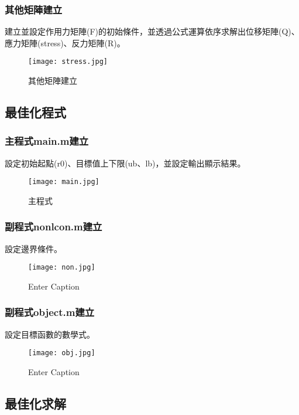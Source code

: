 \documentclass{article}
\begin{document}
\begin{CJK}{UTF8}{bsmi}
        \subsubsection{其他矩陣建立}
        建立並設定作用力矩陣(F)的初始條件，並透過公式運算依序求解出位移矩陣(Q)、應力矩陣(stress)、反力矩陣(R)。
        \begin{figure}[H]
            \centering
            \texttt{[image: stress.jpg]}
            \caption{其他矩陣建立}
            \label{fig:enter-label}
        \end{figure}
        
        
    \subsection{最佳化程式}
    
        \subsubsection{主程式main.m建立}
        設定初始起點(r0)、目標值上下限(ub、lb)，並設定輸出顯示結果。
        \begin{figure}[H]
            \centering
            \texttt{[image: main.jpg]}
            \caption{主程式}
            \label{fig:enter-label}
        \end{figure}
        
        \subsubsection{副程式nonlcon.m建立}
        設定邊界條件。
        \begin{figure}[H]
            \centering
            \texttt{[image: non.jpg]}
            \caption{Enter Caption}
            \label{fig:enter-label}
        \end{figure}
        \subsubsection{副程式object.m建立}
        設定目標函數的數學式。
        \begin{figure}[H]
            \centering
            \texttt{[image: obj.jpg]}
            \caption{Enter Caption}
            \label{fig:enter-label}
        \end{figure}

        
    \subsection{最佳化求解}
    

\end{CJK}
\end{document}
